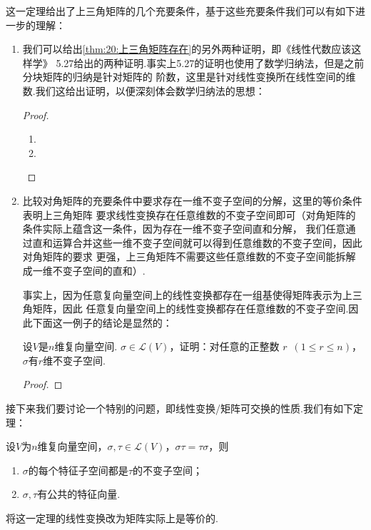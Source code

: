 这一定理给出了上三角矩阵的几个充要条件，基于这些充要条件我们可以有如下进一步的理解：
\begin{enumerate}
    \item 我们可以给出\autoref{thm:20:上三角矩阵存在}的另外两种证明，即《线性代数应该这样学》
    5.27给出的两种证明.事实上5.27的证明也使用了数学归纳法，但是之前分块矩阵的归纳是针对矩阵的
    阶数，这里是针对线性变换所在线性空间的维数.我们这给出证明，以便深刻体会数学归纳法的思想：
    
    \begin{proof}
        \begin{enumerate}
            \item 
            \item 
        \end{enumerate}
    \end{proof}
    
    \item 比较对角矩阵的充要条件中要求存在一维不变子空间的分解，这里的等价条件表明上三角矩阵
    要求线性变换存在任意维数的不变子空间即可（对角矩阵的条件实际上蕴含这一条件，因为存在一维不变子空间直和分解，
    我们任意通过直和运算合并这些一维不变子空间就可以得到任意维数的不变子空间，因此对角矩阵的要求
    更强，上三角矩阵不需要这些任意维数的不变子空间能拆解成一维不变子空间的直和）.
    
    事实上，因为任意复向量空间上的线性变换都存在一组基使得矩阵表示为上三角矩阵，因此
    任意复向量空间上的线性变换都存在任意维数的不变子空间.因此下面这一例子的结论是显然的：
    \begin{example}
        设$V$是$n$维复向量空间. $\sigma\in \mathcal{L}(V)$，证明：对任意的正整数
        $r\enspace(1\leqslant r\leqslant n)$，$\sigma$有$r$维不变子空间.
    \end{example}
    \begin{proof}
        
    \end{proof}
\end{enumerate}

接下来我们要讨论一个特别的问题，即线性变换/矩阵可交换的性质.我们有如下定理：
\begin{theorem}
    设$V$为$n$维复向量空间，$\sigma,\tau\in \mathcal{L}(V)$，$\sigma\tau=\tau\sigma$，则
    \begin{enumerate}[label=(\arabic*)]
        \item $\sigma$的每个特征子空间都是$\tau$的不变子空间；

        \item $\sigma,\tau$有公共的特征向量.
    \end{enumerate}
\end{theorem}
将这一定理的线性变换改为矩阵实际上是等价的.

